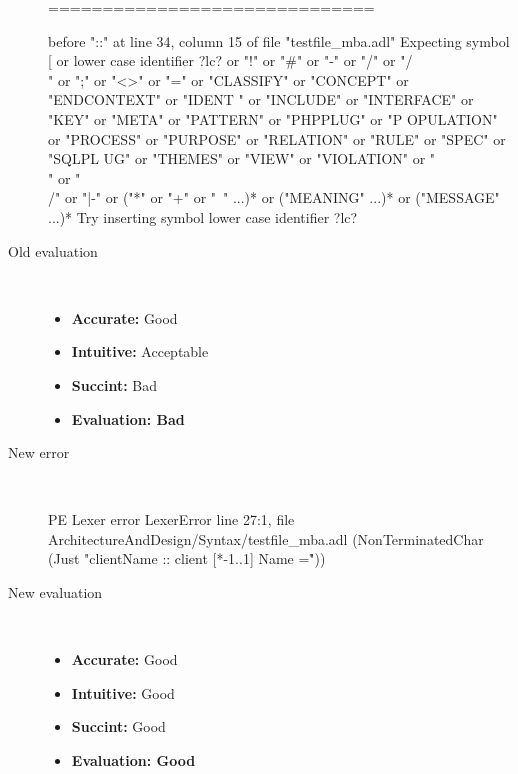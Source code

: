 \begin{description}
\begin{haskell}
==============================

before "::" at line 34, column 15 of file "testfile_mba.adl"
Expecting symbol [ or lower case identifier ?lc? or "!" or "#" or "-" or "/" or
"/\\" or ";" or "<>" or "=" or "CLASSIFY" or "CONCEPT" or "ENDCONTEXT" or "IDENT
" or "INCLUDE" or "INTERFACE" or "KEY" or "META" or "PATTERN" or "PHPPLUG" or "P
OPULATION" or "PROCESS" or "PURPOSE" or "RELATION" or "RULE" or "SPEC" or "SQLPL
UG" or "THEMES" or "VIEW" or "VIOLATION" or "\\" or "\\/" or "|-" or ("*" or "+"
 or "~" ...)* or ("MEANING" ...)* or ("MESSAGE" ...)*
Try inserting symbol lower case identifier ?lc?
\end{haskell}
  \item[Old evaluation]~\\
    \begin{itemize}
    \item \textbf{Accurate:} Good
    \item \textbf{Intuitive:} Acceptable
    \item \textbf{Succint:} Bad
    \item \textbf{Evaluation: Bad}
    \end{itemize}
  \item[New error]~\\
\begin{haskell}
PE Lexer error LexerError line 27:1, file ArchitectureAndDesign/Syntax/testfile_mba.adl (NonTerminatedChar (Just "clientName :: client [*-1..1] Name =\r"))\end{haskell}
  \item[New evaluation]~\\
    \begin{itemize}
    \item \textbf{Accurate:} Good
    \item \textbf{Intuitive:} Good
    \item \textbf{Succint:} Good
    \item \textbf{Evaluation: Good
}
    \end{itemize}
  \end{description}

\hrulefill

